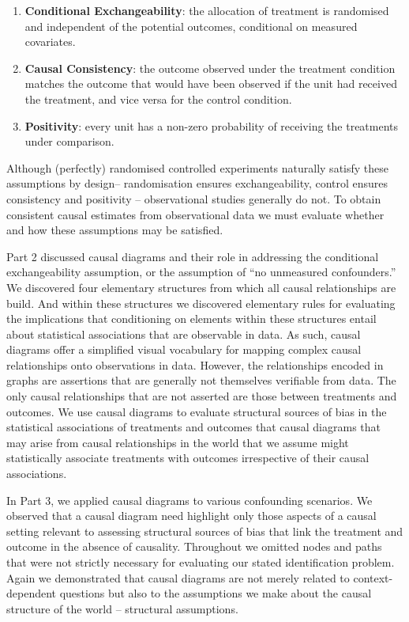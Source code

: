 \documentclass[
  singlecolumn]{article}
\begin{document}
\begin{enumerate}
\def\labelenumi{\arabic{enumi}.}
\item
  \textbf{Conditional Exchangeability}: the allocation of treatment is
  randomised and independent of the potential outcomes, conditional on
  measured covariates.
\item
  \textbf{Causal Consistency}: the outcome observed under the treatment
  condition matches the outcome that would have been observed if the
  unit had received the treatment, and vice versa for the control
  condition.
\item
  \textbf{Positivity}: every unit has a non-zero probability of
  receiving the treatments under comparison.
\end{enumerate}

Although (perfectly) randomised controlled experiments naturally satisfy
these assumptions by design-- randomisation ensures exchangeability,
control ensures consistency and positivity -- observational studies
generally do not. To obtain consistent causal estimates from
observational data we must evaluate whether and how these assumptions
may be satisfied.

Part 2 discussed causal diagrams and their role in addressing the
conditional exchangeability assumption, or the assumption of ``no
unmeasured confounders.'' We discovered four elementary structures from
which all causal relationships are build. And within these structures we
discovered elementary rules for evaluating the implications that
conditioning on elements within these structures entail about
statistical associations that are observable in data. As such, causal
diagrams offer a simplified visual vocabulary for mapping complex causal
relationships onto observations in data. However, the relationships
encoded in graphs are assertions that are generally not themselves
verifiable from data. The only causal relationships that are not
asserted are those between treatments and outcomes. We use causal
diagrams to evaluate structural sources of bias in the statistical
associations of treatments and outcomes that causal diagrams that may
arise from causal relationships in the world that we assume might
statistically associate treatments with outcomes irrespective of their
causal associations.

In Part 3, we applied causal diagrams to various confounding scenarios.
We observed that a causal diagram need highlight only those aspects of a
causal setting relevant to assessing structural sources of bias that
link the treatment and outcome in the absence of causality. Throughout
we omitted nodes and paths that were not strictly necessary for
evaluating our stated identification problem. Again we demonstrated that
causal diagrams are not merely related to context-dependent questions
but also to the assumptions we make about the causal structure of the
world -- structural assumptions.
\end{document}
